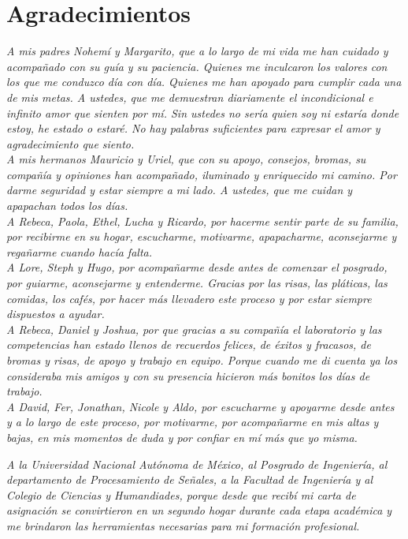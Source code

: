 \chapter*{Agradecimientos}

\textit{A mis padres Nohemí y Margarito, que a lo largo de mi vida me han cuidado y acompañado con su guía y su paciencia. Quienes me inculcaron los valores con los que me conduzco día con día. Quienes me han apoyado para cumplir cada una de mis metas. A ustedes, que me demuestran diariamente el incondicional e infinito amor que sienten por mí. Sin ustedes no sería quien soy ni estaría donde estoy, he estado o estaré. No hay palabras suficientes para expresar el amor y agradecimiento que siento.}\\

\textit{A mis hermanos Mauricio y Uriel, que con su apoyo, consejos, bromas, su compañía y opiniones han acompañado, iluminado y enriquecido mi camino. Por darme seguridad y estar siempre a mi lado. A ustedes, que me cuidan y apapachan todos los días.}\\

\textit{A Rebeca, Paola, Ethel, Lucha y Ricardo, por hacerme sentir parte de su familia, por recibirme en su hogar, escucharme, motivarme, apapacharme, aconsejarme y regañarme cuando hacía falta.}\\

\textit{A Lore, Steph y Hugo, por acompañarme desde antes de comenzar el posgrado, por guiarme, aconsejarme y entenderme. Gracias por las risas, las pláticas, las comidas, los cafés, por hacer más llevadero este proceso y por estar siempre dispuestos a ayudar.}\\

\textit{A Rebeca, Daniel y Joshua, por que gracias a su compañía el laboratorio y las competencias han estado llenos de recuerdos felices, de éxitos y fracasos, de bromas y risas, de apoyo y trabajo en equipo. Porque cuando me di cuenta ya los consideraba mis amigos y con su presencia hicieron más bonitos los días de trabajo.}\\

\textit{A David, Fer, Jonathan, Nicole y Aldo, por escucharme y apoyarme desde antes y a lo largo de este proceso, por motivarme, por acompañarme en mis altas y bajas, en mis momentos de duda y por confiar en mí más que yo misma.}\\


\newpage

\textit{A la Universidad Nacional Autónoma de México, al Posgrado de Ingeniería, al departamento de Procesamiento de Señales, a la Facultad de Ingeniería y al Colegio de Ciencias y Humandiades, porque desde que recibí mi carta de asignación se convirtieron en un segundo hogar durante cada etapa académica y me brindaron las herramientas necesarias para mi formación profesional.}\\

